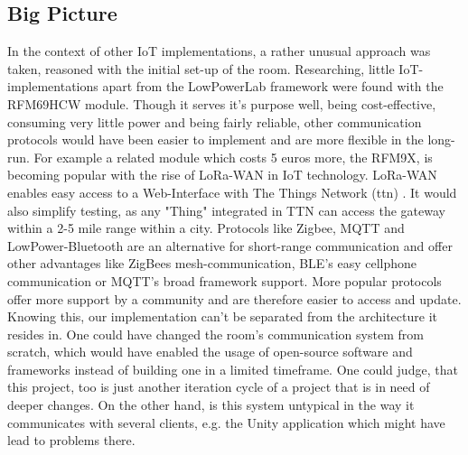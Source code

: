 \subsection{Big Picture}
In the context of other IoT implementations, a rather unusual approach was taken, reasoned with the initial set-up of the room.
Researching, little IoT-implementations apart from the LowPowerLab framework were found with the RFM69HCW module. 
Though it serves it's purpose well, being cost-effective, consuming very little power and being fairly reliable,
other communication protocols would have been easier to implement and are more flexible in the long-run.
For example a related module which costs 5 euros more, the RFM9X, is becoming popular with the rise of LoRa-WAN in IoT technology. 
LoRa-WAN enables easy access to a Web-Interface with The Things Network (ttn) \parencite{TTN}.
It would also simplify testing, as any "Thing" integrated in TTN can access the gateway within a 2-5 mile range within a city. 
Protocols like Zigbee, MQTT and LowPower-Bluetooth are an alternative for short-range communication and offer other 
advantages like ZigBees mesh-communication, BLE's easy cellphone communication or MQTT's broad framework support.
More popular protocols offer more support by a community and are therefore easier to access and update.
Knowing this, our implementation can't be separated from the architecture it resides in. 
One could have changed the room's communication system from scratch, 
which would have enabled the usage of open-source software and frameworks instead of building one in a limited timeframe.
One could judge, that this project, too is just another iteration cycle of a project that is in need of deeper changes. 
On the other hand, is this system untypical in the way it communicates with several clients, 
e.g. the Unity application which might have lead to problems there.


